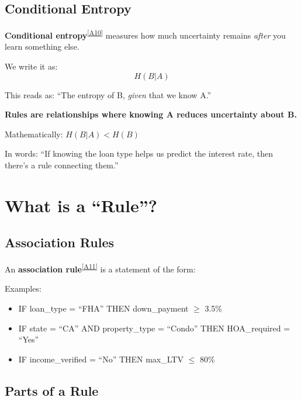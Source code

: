 \documentclass[11pt,a4paper]{article}
\newcommand{\term}[2]{\textcolor{termcolor}{\textbf{#1}}\textsuperscript{\hyperref[#2]{[#2]}}}
\begin{document}
\subsection{Conditional Entropy}

\term{Conditional entropy}{A10} measures how much uncertainty remains \textit{after} you learn something else.

We write it as:
\begin{equation}
H(B | A)
\end{equation}

This reads as: ``The entropy of B, \textit{given} that we know A.''

\begin{keyidea}
\textbf{Rules are relationships where knowing A reduces uncertainty about B.}

Mathematically: $H(B|A) < H(B)$

In words: ``If knowing the loan type helps us predict the interest rate, then there's a rule connecting them.''
\end{keyidea}

\section{What is a ``Rule''?}

\subsection{Association Rules}

An \term{association rule}{A11} is a statement of the form:

\begin{center}
\end{center}

Examples:
\begin{itemize}
    \item IF loan\_type = ``FHA'' THEN down\_payment $\geq$ 3.5\%
    \item IF state = ``CA'' AND property\_type = ``Condo'' THEN HOA\_required = ``Yes''
    \item IF income\_verified = ``No'' THEN max\_LTV $\leq$ 80\%
\end{itemize}

\subsection{Parts of a Rule}
\end{document}
